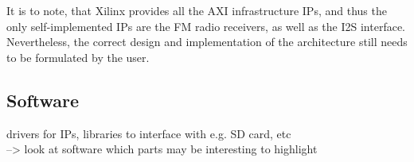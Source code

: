 It is to note, that Xilinx provides all the AXI infrastructure IPs, and thus the only self-implemented IPs are the FM radio receivers, as well as the I2S interface.
Nevertheless, the correct design and implementation of the architecture still needs to be formulated by the user.

\subsection{Software}

drivers for IPs, libraries to interface with e.g. SD card, etc\\
--> look at software which parts may be interesting to highlight
